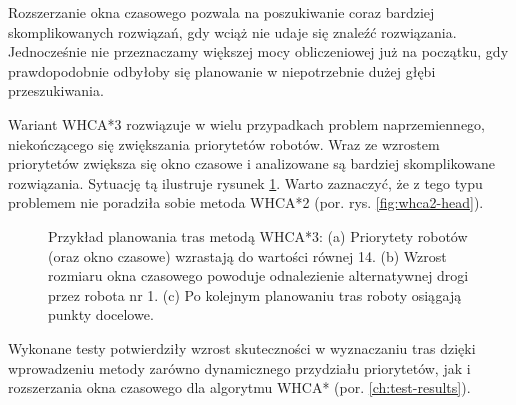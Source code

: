 Rozszerzanie okna czasowego pozwala na poszukiwanie coraz bardziej skomplikowanych rozwiązań, gdy wciąż nie udaje się znaleźć rozwiązania. Jednocześnie nie przeznaczamy większej mocy obliczeniowej już na początku, gdy prawdopodobnie odbyłoby się planowanie w niepotrzebnie dużej głębi przeszukiwania.

Wariant WHCA*3 rozwiązuje w wielu przypadkach problem naprzemiennego, niekończącego się zwiększania priorytetów robotów.
Wraz ze wzrostem priorytetów zwiększa się okno czasowe i analizowane są bardziej skomplikowane rozwiązania.
Sytuację tą ilustruje rysunek \ref{fig:whca3-head}.
Warto zaznaczyć, że z tego typu problemem nie poradziła sobie metoda WHCA*2 (por. rys. \ref{fig:whca2-head}).
\begin{figure}[H]
	\centering
		\qquad
		\qquad
	\caption{Przykład planowania tras metodą WHCA*3:
	(a) Priorytety robotów (oraz okno czasowe) wzrastają do wartości równej 14.
	(b) Wzrost rozmiaru okna czasowego powoduje odnalezienie alternatywnej drogi przez robota nr 1.
	(c) Po kolejnym planowaniu tras roboty osiągają punkty docelowe.}
	\label{fig:whca3-head}
\end{figure}


Wykonane testy potwierdziły wzrost skuteczności w wyznaczaniu tras dzięki wprowadzeniu metody zarówno dynamicznego przydziału priorytetów, jak i rozszerzania okna czasowego dla algorytmu WHCA* (por. \ref{ch:test-results}).